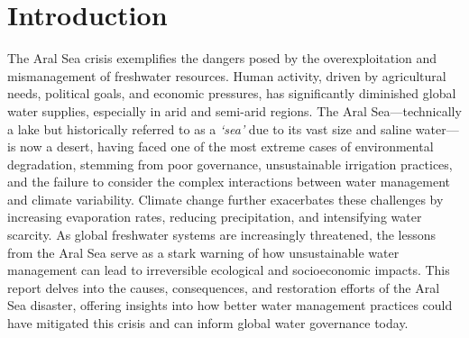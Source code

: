 

\chapter[Introduction]{Introduction}
\label{cp:introduction}

\vspace{.935em}

The Aral Sea crisis exemplifies the dangers posed by the overexploitation and mismanagement of freshwater resources. Human activity, driven by agricultural needs, political goals, and economic pressures, has significantly diminished global water supplies, especially in arid and semi-arid regions. The Aral Sea—technically a lake but historically referred to as a \textit{`sea'} due to its vast size and saline water—is now a desert, having faced one of the most extreme cases of environmental degradation, stemming from poor governance, unsustainable irrigation practices, and the failure to consider the complex interactions between water management and climate variability.\autocite{natgeo_aral} Climate change further exacerbates these challenges by increasing evaporation rates, reducing precipitation, and intensifying water scarcity. As global freshwater systems are increasingly threatened, the lessons from the Aral Sea serve as a stark warning of how unsustainable water management can lead to irreversible ecological and socioeconomic impacts. This report delves into the causes, consequences, and restoration efforts of the Aral Sea disaster, offering insights into how better water management practices could have mitigated this crisis and can inform global water governance today. 

